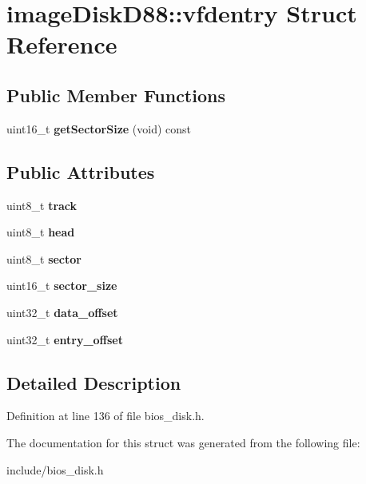 \hypertarget{structimageDiskD88_1_1vfdentry}{\section{image\-Disk\-D88\-:\-:vfdentry Struct Reference}
\label{structimageDiskD88_1_1vfdentry}
}
\subsection*{Public Member Functions}
\begin{DoxyCompactItemize}
\item 
\hypertarget{structimageDiskD88_1_1vfdentry_a308243cc68ff88697a893f66c99243e5}{uint16\-\_\-t {\bfseries get\-Sector\-Size} (void) const }\label{structimageDiskD88_1_1vfdentry_a308243cc68ff88697a893f66c99243e5}

\end{DoxyCompactItemize}
\subsection*{Public Attributes}
\begin{DoxyCompactItemize}
\item 
\hypertarget{structimageDiskD88_1_1vfdentry_ab6be8861bab810343858d2b3eb2c80cd}{uint8\-\_\-t {\bfseries track}}\label{structimageDiskD88_1_1vfdentry_ab6be8861bab810343858d2b3eb2c80cd}

\item 
\hypertarget{structimageDiskD88_1_1vfdentry_a9d77966ce846181817e786de4c17f005}{uint8\-\_\-t {\bfseries head}}\label{structimageDiskD88_1_1vfdentry_a9d77966ce846181817e786de4c17f005}

\item 
\hypertarget{structimageDiskD88_1_1vfdentry_acca39005f709d218d88f31f7f4622cb4}{uint8\-\_\-t {\bfseries sector}}\label{structimageDiskD88_1_1vfdentry_acca39005f709d218d88f31f7f4622cb4}

\item 
\hypertarget{structimageDiskD88_1_1vfdentry_a38d94595d696210f20897f239fa39e44}{uint16\-\_\-t {\bfseries sector\-\_\-size}}\label{structimageDiskD88_1_1vfdentry_a38d94595d696210f20897f239fa39e44}

\item 
\hypertarget{structimageDiskD88_1_1vfdentry_a39b1b5ef8922b2b16a63d207b155d49c}{uint32\-\_\-t {\bfseries data\-\_\-offset}}\label{structimageDiskD88_1_1vfdentry_a39b1b5ef8922b2b16a63d207b155d49c}

\item 
\hypertarget{structimageDiskD88_1_1vfdentry_aa58f7c17c694ab100aa242aa90b45868}{uint32\-\_\-t {\bfseries entry\-\_\-offset}}\label{structimageDiskD88_1_1vfdentry_aa58f7c17c694ab100aa242aa90b45868}

\end{DoxyCompactItemize}


\subsection{Detailed Description}


Definition at line 136 of file bios\-\_\-disk.\-h.



The documentation for this struct was generated from the following file\-:\begin{DoxyCompactItemize}
\item 
include/bios\-\_\-disk.\-h\end{DoxyCompactItemize}
